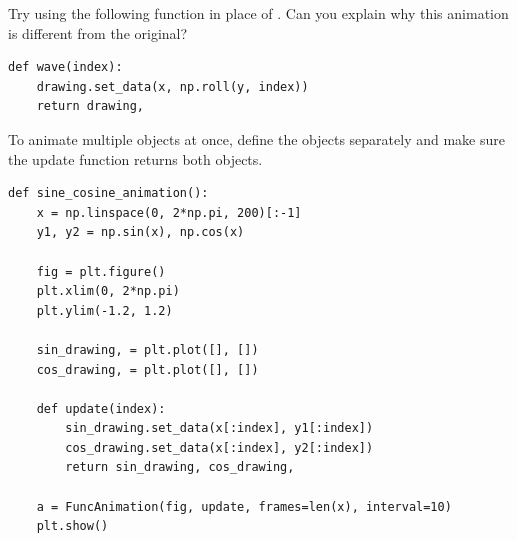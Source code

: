 Try using the following function in place of .
Can you explain why this animation is different from the original?

\begin{lstlisting}
def wave(index):
    drawing.set_data(x, np.roll(y, index))
    return drawing,
\end{lstlisting}

To animate multiple objects at once, define the objects separately and make sure the update function returns both objects.

\begin{lstlisting}
def sine_cosine_animation():
    x = np.linspace(0, 2*np.pi, 200)[:-1]
    y1, y2 = np.sin(x), np.cos(x)

    fig = plt.figure()
    plt.xlim(0, 2*np.pi)
    plt.ylim(-1.2, 1.2)

    sin_drawing, = plt.plot([], [])
    cos_drawing, = plt.plot([], [])

    def update(index):
        sin_drawing.set_data(x[:index], y1[:index])
        cos_drawing.set_data(x[:index], y2[:index])
        return sin_drawing, cos_drawing,

    a = FuncAnimation(fig, update, frames=len(x), interval=10)
    plt.show()
\end{lstlisting}

